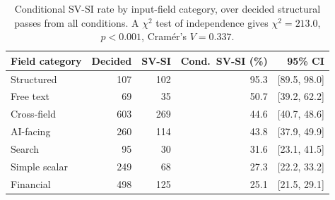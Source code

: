 \begin{table}[t]
\caption{Conditional SV-SI rate by input-field category, over decided structural passes from all
conditions. A $\chi^2$ test of independence gives $\chi^2=213.0$, $p<0.001$, Cram\'er's $V=0.337$.}
\label{tab:categories}
\centering
\begin{tabular}{lrrrr}
\toprule
Field category & Decided & SV-SI & Cond.\ SV-SI (\%) & 95\% CI \\
\midrule
Structured & 107 & 102 & 95.3 & [89.5, 98.0] \\
Free text & 69 & 35 & 50.7 & [39.2, 62.2] \\
Cross-field & 603 & 269 & 44.6 & [40.7, 48.6] \\
AI-facing & 260 & 114 & 43.8 & [37.9, 49.9] \\
Search & 95 & 30 & 31.6 & [23.1, 41.5] \\
Simple scalar & 249 & 68 & 27.3 & [22.2, 33.2] \\
Financial & 498 & 125 & 25.1 & [21.5, 29.1] \\
\bottomrule
\end{tabular}
\end{table}
